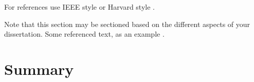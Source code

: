 For references use IEEE style \citep{IEEERefStyle} or Harvard style \citep{HarvRefStyle}.

Note that this section may be sectioned based on the different aspects of your dissertation.  Some referenced text, as an example \citep{Arrighi2003, WithersMartinez2012, Ebejer2016}.

\section{Summary}
\blindtext[3]
